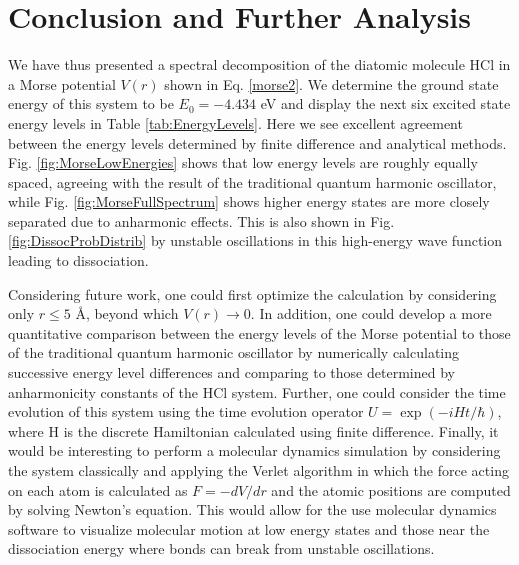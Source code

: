 \documentclass[%
aps, %
prl, %
preprint, %
12pt, %
amsfonts, %
amssymb, %
amsmath, %
endfloats,%
raggedbottom, %
]{revtex4-1}
\begin{document}
\section{\label{sec:Conclusion_Future_Work}Conclusion and Further Analysis}
We have thus presented a spectral decomposition of the diatomic molecule HCl in a Morse potential
$V(r)$ shown in Eq. \ref{morse2}. We determine the ground state energy of this system to be
$E_0 = -4.434$ eV and display the next six excited state energy levels in Table
\ref{tab:EnergyLevels}. Here we see excellent agreement between the energy levels determined by finite
difference and analytical methods. Fig. \ref{fig:MorseLowEnergies} shows that low energy levels are
roughly equally spaced, agreeing with the result of the traditional quantum harmonic oscillator, while
Fig. \ref{fig:MorseFullSpectrum} shows higher energy states are more closely separated due to
anharmonic effects. This is also shown in Fig. \ref{fig:DissocProbDistrib} by unstable oscillations in
this high-energy wave function leading to dissociation.

Considering future work, one could first optimize the calculation by considering only $r \leq 5$ Å, beyond
which $V(r) \rightarrow 0$. In addition, one could develop a more quantitative comparison between the energy levels of the Morse potential
to those of the traditional quantum harmonic oscillator by numerically calculating successive energy
level differences and comparing to those determined by anharmonicity constants of the HCl system.
Further, one could consider the time evolution of this system using the time evolution operator $U = \exp{(-iHt/\hbar)}$, where H
is the discrete Hamiltonian calculated using finite difference. Finally, it would be interesting to
perform a molecular dynamics simulation by considering the system classically and applying the Verlet
algorithm in which the force acting on each atom is calculated as $F = -dV/dr$ and the atomic positions are
computed by solving Newton's equation. This would allow for the use molecular dynamics software to
visualize molecular motion at low energy states and those near the dissociation energy where bonds can break
from unstable oscillations.
\end{document}
